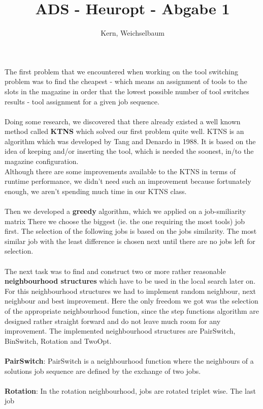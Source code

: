 \documentclass[12pt]{article}
\title{ADS - Heuropt - Abgabe 1}
\author{Kern, Weichselbaum}
\begin{document}
	
\maketitle
The first problem that we encountered when working on the tool switching problem was to find the cheapest - which means an assignment of tools to the slots in the magazine in order that the lowest possible number of tool switches results - tool assignment for a given job sequence. 
\\
\\
Doing some research, we discovered that there already existed a well known method called \textbf{KTNS} which solved our first 
problem quite well. KTNS is an algorithm which was developed by Tang and Denardo
in 1988. It is based on the idea of keeping and/or inserting the tool, which is needed the soonest, in/to the magazine configuration.
\\
Although there are some improvements available to the KTNS in terms of runtime performance, we didn't need such an improvement because fortunately enough, we aren't spending much time in our KTNS class.
\\
\\
Then we developed a \textbf{greedy} algorithm, which we applied on a job-smiliarity matrix
There we choose the biggest (ie. the one requiring the most tools) job first. The selection of the following jobs is 
based on the jobs similarity. The most similar job with the least difference is 
chosen next until there are no jobs left for selection.
\\
\\
The next task was to find and construct two or more 
rather reasonable \textbf{neighbourhood structures} which have to be used in the local search
later on. For this neighbourhood structures we had to implement random neighbour, 
next neighbour and best improvement. Here the only freedom we got was the selection
of the appropriate neighbourhood function, since the step functions algorithm are 
designed rather straight forward and do not leave much room for any improvement. 
The implemented neighbourhood structures are PairSwitch, BinSwitch, Rotation and TwoOpt.
\\
\\
\textbf{PairSwitch}:  PairSwitch is a neighbourhood function where the neighbours of a solutions
job sequence are defined by the exchange of two jobs.
\\
\\
\textbf{Rotation}: In the rotation neighbourhood, jobs are rotated triplet wise. The last job 
\end{document}

